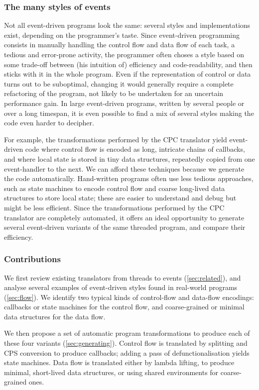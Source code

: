 \documentclass[a4paper]{llncs}
\begin{document}
\subsubsection{The many styles of events}

Not all event-driven programs look the same: several styles and implementations
exist, depending on the programmer's taste.  Since event-driven programming
consists in manually handling the control flow and data flow of each task, a
tedious and error-prone activity, the programmer often choses a style based on
some trade-off between (his intuition of) efficiency and code-readability,
and then sticks with it in the whole program.  Even if the representation of
control or data turns out to be suboptimal, changing it would generally require
a complete refactoring of the program, not likely to be undertaken for an
uncertain performance gain.  In large event-driven programs, written by several
people or over a long timespan, it is even possible to find a mix of several
styles making the code even harder to decipher.

For example, the transformations performed by the CPC translator yield
event-driven code where control flow is encoded as long, intricate chains of
callbacks, and where local state is stored in tiny data structures, repeatedly
copied from one event-handler to the next.  We can afford these techniques
because we generate the code automatically. Hand-written programs often use less
tedious approaches, such as state machines to encode control flow and coarse
long-lived data structures to store local state; these are easier to
understand and debug but might be less efficient.  Since the transformations
performed by the CPC translator are completely automated, it offers an ideal
opportunity to generate several event-driven variants of the same threaded
program, and compare their efficiency.

\subsubsection{Contributions}

We first review existing translators from threads to events
(\cref{sec:related}), and analyse several examples of event-driven styles found
in real-world programs (\cref{sec:flow}).  We identify two typical kinds of
control-flow and data-flow encodings: callbacks or state machines for the
control flow, and coarse-grained or minimal data structures for the data flow.

We then propose a set of automatic program transformations to produce each of
these four variants (\cref{sec:generating}).  Control flow is translated by
splitting and CPS conversion to produce callbacks; adding a pass of
defunctionalisation yields state machines.  Data flow is translated either by
lambda lifting, to produce minimal, short-lived data structures, or using shared
environments for coarse-grained ones.
\end{document}
